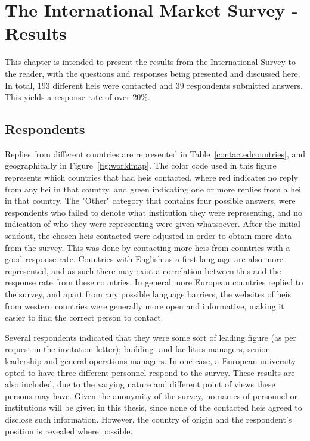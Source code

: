 \chapter{The International Market Survey - Results}
\renewcommand{\arraystretch}{1.5}
This chapter is intended to present the results from the International Survey to the reader, with the questions and responses being presented and discussed here. In total, 193 different \glspl{hei} were contacted and 39 respondents submitted answers. This yields a response rate of over 20\%. 
\section{Respondents}
Replies from different countries are represented in Table~\ref{contactedcountries}, and geographically in Figure~\ref{fig:worldmap}. The color code used in this figure represents which countries that had \glspl{hei} contacted, where red indicates no reply from any \gls{hei} in that country, and green indicating one or more replies from a \gls{hei} in that country. The "Other" category that contains four possible answers, were respondents who failed to denote what institution they were representing, and no indication of who they were representing were given whatsoever. After the initial sendout, the chosen \glspl{hei} contacted were adjusted in order to obtain more data from the survey. This was done by contacting more \glspl{hei} from countries with a good response rate. Countries with English as a first language are also more represented, and as such there may exist a correlation between this and the response rate from these countries. In general more European countries replied to the survey, and apart from any possible language barriers, the websites of \glspl{hei} from western countries were generally more open and informative, making it easier to find the correct person to contact. 


Several respondents indicated that they were some sort of leading figure (as per request in the invitation letter); building- and facilities managers, senior leadership and general operations managers. In one case, a European university opted to have three different personnel respond to the survey. These results are also included, due to the varying nature and different point of views these persons may have. Given the anonymity of the survey, no names of personnel or institutions will be given in this thesis, since none of the contacted \glspl{hei} agreed to disclose such information. However, the country of origin and the respondent's position is revealed where possible. 


